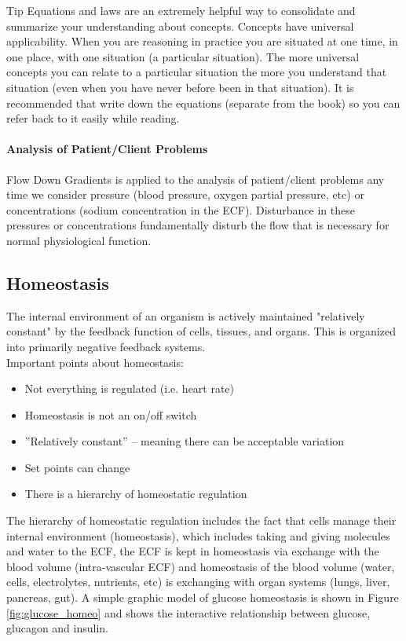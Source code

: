 \begin{tips}{Tip}
Equations and laws are an extremely helpful way to consolidate and summarize your understanding about concepts. Concepts have universal applicability. When you are reasoning in practice you are situated at one time, in one place, with one situation (a particular situation). The more universal concepts you can relate to a particular situation the more you understand that situation (even when you have never before been in that situation). It is recommended that write down the equations (separate from the book) so you can refer back to it easily while reading.
\end{tips}


\paragraph{Analysis of Patient/Client Problems}
Flow Down Gradients is applied to the analysis of patient/client problems any time we consider pressure (blood pressure, oxygen partial pressure, etc) or concentrations (sodium concentration in the ECF). Disturbance in these pressures or concentrations fundamentally disturb the flow that is necessary for normal physiological function.

\subsection{Homeostasis}
The internal environment of an organism is actively maintained "relatively constant" by the feedback function of cells, tissues, and organs. This is organized into primarily negative feedback systems.\\
Important points about homeostasis:
\begin{itemize}
    \item Not everything is regulated (i.e. heart rate)
    \item Homeostasis is not an on/off switch
    \item ”Relatively constant” – meaning there can be acceptable variation
    \item Set points can change
    \item There is a hierarchy of homeostatic regulation
\end{itemize}

The hierarchy of homeostatic regulation includes the fact that cells manage their internal environment (homeostasis), which includes taking and giving molecules and water to the ECF, the ECF is kept in homeostasis via exchange with the blood volume (intra-vascular ECF) and homeostasis of the blood volume (water, cells, electrolytes, nutrients, etc) is exchanging with organ systems (lungs, liver, pancreas, gut). A simple graphic model of glucose homeostasis is shown in Figure \ref{fig:glucose_homeo} and shows the interactive relationship between glucose, glucagon and insulin.

